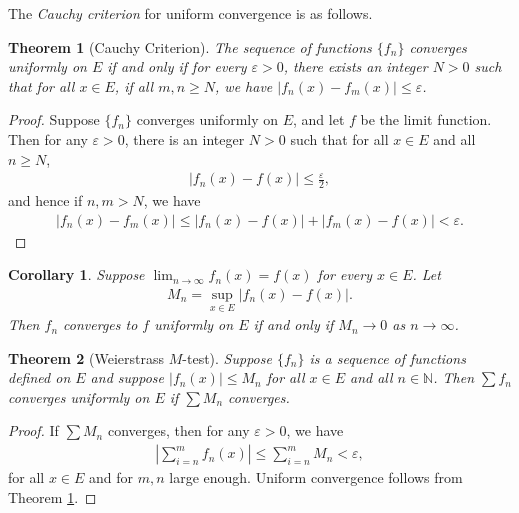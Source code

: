\documentclass[10pt]{book}
\newtheorem{theorem}{Theorem}[chapter]
\newtheorem{corollary}{Corollary}[theorem]
\theoremstyle{definition}
\numberwithin{equation}{chapter}
\begin{document}
\medskip

The {\em Cauchy criterion} for uniform convergence is as follows.

\medskip

\begin{theorem}[Cauchy Criterion]\label{th_61}
The sequence of functions $\{f_n\}$ converges uniformly on $E$ if and only if for every $\varepsilon > 0$, there exists an integer $N > 0$ such that for all $x \in E$, if all $m,n \geq N$, we have $\left|f_n(x) - f_m(x)\right| \leq \varepsilon$.
\end{theorem}
\begin{proof}
Suppose $\{f_n\}$ converges uniformly on $E$, and let $f$ be the limit function. Then for any $\varepsilon > 0$, there is an integer $N > 0$ such that for all $x \in E$ and all $n \geq N$,
\begin{align*}
    \left|f_n(x) - f(x)\right| \leq \frac{\varepsilon}{2},
\end{align*}
and hence if $n,m > N$, we have
\begin{align*}
    \left|f_n(x) - f_m(x)\right| \leq \left|f_n(x) - f(x)\right| + \left|f_m(x) - f(x)\right| < \varepsilon.
\end{align*}
\end{proof}

\medskip

\begin{corollary}\label{coro_611}
Suppose $\lim_{n\to\infty} f_n(x) = f(x)$ for every $x \in E$. Let
\begin{align*}
    M_n = \sup_{x \in E} \left|f_n(x) - f(x)\right|.
\end{align*}
Then $f_n$ converges to $f$ uniformly on $E$ if and only if $M_n \to 0$ as $n \to \infty$.
\end{corollary}

\medskip

\begin{theorem}[Weierstrass $M$-test]\label{th_62}
Suppose $\{f_n\}$ is a sequence of functions defined on $E$ and suppose $\left|f_n(x)\right| \leq M_n$ for all $x \in E$ and all $n \in \mathbb{N}$. Then $\sum f_n$ converges uniformly on $E$ if $\sum M_n$ converges. 
\end{theorem}
\begin{proof}
If $\sum M_n$ converges, then for any $\varepsilon > 0$, we have
\begin{align*}
    \left|\sum^m_{i=n} f_n(x)\right| \leq \sum^m_{i=n} M_n < \varepsilon,
\end{align*}
for all $x \in E$ and for $m,n$ large enough. Uniform convergence follows from Theorem \ref{th_61}.
\end{proof}
\end{document}
